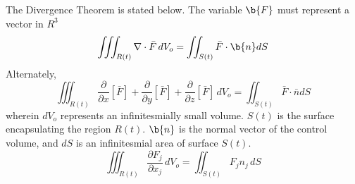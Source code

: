 
The Divergence Theorem is stated below. The variable $\b{F}$ must represent a vector in $R^3$
$$\iiint_{R(t)}  \nabla \cdot \bar{F} \,dV_o = \iint_{S(t)}\bar{F} \cdot \b{n}dS$$
Alternately,
$$\iiint_{R(t)}  \frac{\partial}{\partial x}[\bar{F}] + \frac{\partial}{\partial y}[\bar{F}] + \frac{\partial}{\partial z}[\bar{F}] \,dV_o = \iint_{S(t)}\bar{F}\cdot \bar{n}dS$$
wherein $dV_o$ represents an infinitesmially small volume. $S(t)$ is the surface encapsulating the region $R(t)$. $\b{n}$ is the normal vector of the control volume, and $dS$ is an infinitesmial area of surface $S(t)$.
\begin{equation}\iiint^{}_{R(t)} \frac{\partial F_{j}}{\partial x_{j}} \,dV_{o} = \iint^{}_{S(t)} F_{j}n_{j} \,dS \label{Tensor Index Notation Divergence Theorem}\end{equation}




